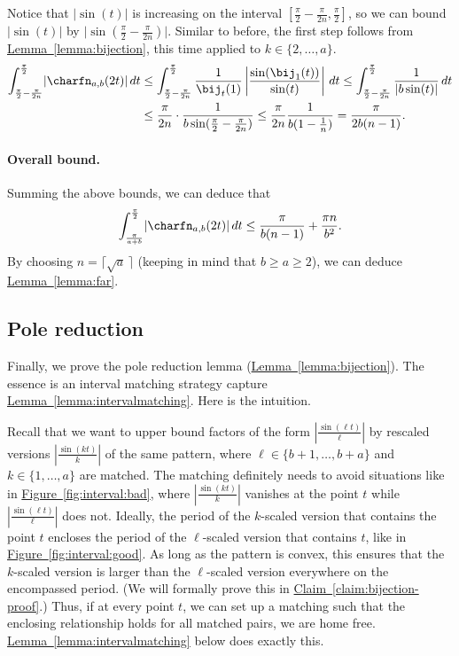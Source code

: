 \documentclass[11pt]{article}
\numberwithin{equation}{section}
\theoremstyle{definition}
\theoremstyle{plain}
\newcommand{\expref}[2]{\hyperref[#2]{#1~\ref{#2}}}
\begin{document}
Notice that $\lvert\sin(t)\rvert$ is increasing on the interval $[\frac{\pi}{2}-\frac{\pi}{2n},\frac{\pi}{2}]$, so we can bound $\lvert\sin(t)\rvert$ by $\lvert\sin(\frac{\pi}{2}-\frac{\pi}{2n})\rvert$. Similar to before, the first step follows from \expref{Lemma}{lemma:bijection}, this time applied to $k \in \{2,\dots,a\}$. 
\begin{align*}
    \int_{\frac{\pi}{2}-\frac{\pi}{2n}}^{\frac{\pi}{2}} \lvert\charfn_{a,b}(2t)\rvert\,dt 
    &\le \int_{\frac{\pi}{2}-\frac{\pi}{2n}}^{\frac{\pi}{2}} \frac{1}{\bij_t(1)} \left\lvert\frac{\sin(\bij_1(t))}{\sin(t)}\right\rvert\,dt
    \le \int_{\frac{\pi}{2}-\frac{\pi}{2n}}^{\frac{\pi}{2}} \frac{1}{|b \sin(t)|}\,dt\\
    &\le \frac{\pi}{2n}\cdot \frac{1}{b\sin(\frac{\pi}{2}-\frac{\pi}{2n})}
    \le \frac{\pi}{2n}\frac{1}{b(1-\frac{1}{n})}
    = \frac{\pi}{2b(n-1)}.
\end{align*}

\paragraph{Overall bound.}

Summing the above bounds, we can deduce that
\[\int_{\frac{\pi}{a+b}}^{\frac{\pi}{2}} \lvert\charfn_{a,b}(2t)\rvert\,dt \le \frac{\pi}{b(n-1)}+\frac{\pi n}{b^2}.  \]
By choosing $n=\lceil\sqrt{a} \,\rceil$ (keeping in mind that $b\ge a \ge 2$), we can deduce \expref{Lemma}{lemma:far}.

\subsection{Pole reduction}
\label{sec:pole-reduction}

Finally, we prove the pole reduction lemma (\expref{Lemma}{lemma:bijection}). The essence is an interval matching strategy capture \expref{Lemma}{lemma:intervalmatching}. Here is the intuition. 

Recall that we want to upper bound factors of the form $|\frac{\sin(\ell t)}{\ell}|$ by rescaled versions $|\frac{\sin(k t)}{k}|$ of the same pattern, where $\ell \in \{b+1,\dots,b+a\}$ and $k \in \{1,\dots,a\}$ are matched. The matching definitely needs to avoid situations like in \expref{Figure}{fig:interval:bad}, where $|\frac{\sin(kt)}{k}|$ vanishes at the point $t$ while $|\frac{\sin(\ell t)}{\ell}|$ does not. Ideally, the period of the $k$-scaled version that contains the point $t$ encloses the period of the $\ell$-scaled version that contains $t$, like in \expref{Figure}{fig:interval:good}. As long as the pattern is convex, this ensures that the $k$-scaled version is larger than the $\ell$-scaled version everywhere on the encompassed period. (We will formally prove this in \expref{Claim}{claim:bijection-proof}.) Thus, if at every point $t$, we can set up a matching such that the enclosing relationship holds for all matched pairs, we are home free. \expref{Lemma}{lemma:intervalmatching} below does exactly this.
\end{document}
